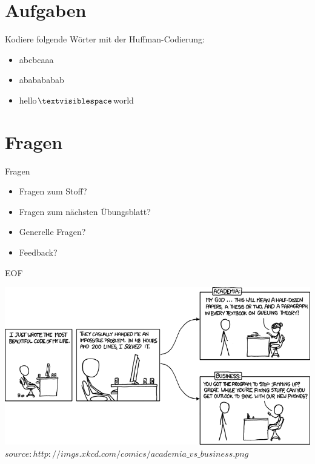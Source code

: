 	
	\section{Aufgaben}
	\begin{frame}
		\begin{block}{}
			Kodiere folgende Wörter mit der Huffman-Codierung:
			\begin{itemize}
				\item abcbcaaa
				\item ababababab
				\item hello$\textvisiblespace$world
			\end{itemize}
		\end{block}	
	\end{frame}
	
	
	
	
	\section{Fragen}
	\begin{frame} {Fragen}
		\begin{itemize}
			\item Fragen zum Stoff?
			\item Fragen zum n\"achsten \"Ubungsblatt?
			\item Generelle Fragen?
			\item Feedback?
		\end{itemize}
	\end{frame}

		
	\begin{frame} {EOF}
		\begin{center}
			\includegraphics[scale=0.45]{graphics/eof6.png}\\
			\tiny $source: http://imgs.xkcd.com/comics/academia\_vs\_business.png$
		\end{center}
	\end{frame}



